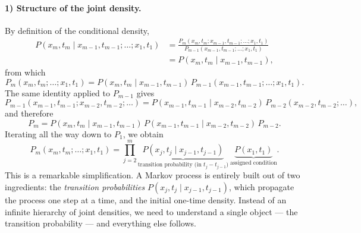 \paragraph{1) Structure of the joint density.}
By definition of the conditional density,
\begin{equation}\begin{split}
P(x_m,t_m\mid x_{m-1},t_{m-1};\dots;x_1,t_1)
&= \frac{P_m(x_m,t_m;x_{m-1},t_{m-1};\dots;x_1,t_1)}{P_{m-1}(x_{m-1},t_{m-1};\dots;x_1,t_1)}\\
&= P(x_m,t_m\mid x_{m-1},t_{m-1}),
\end{split}\end{equation}
from which
\begin{equation}
P_m(x_m,t_m;\dots;x_1,t_1) = P(x_m,t_m\mid x_{m-1},t_{m-1})\,P_{m-1}(x_{m-1},t_{m-1};\dots;x_1,t_1).
\end{equation}
The same identity applied to $P_{m-1}$ gives
\begin{equation}
P_{m-1}(x_{m-1},t_{m-1};x_{m-2},t_{m-2};\dots) = P(x_{m-1},t_{m-1}\mid x_{m-2},t_{m-2})\,P_{m-2}(x_{m-2},t_{m-2};\dots),
\end{equation}
and therefore
\begin{equation}
P_m = P(x_m,t_m\mid x_{m-1},t_{m-1})\,P(x_{m-1},t_{m-1}\mid x_{m-2},t_{m-2})\,P_{m-2}.
\end{equation}
Iterating all the way down to $P_1$, we obtain
\begin{equation}
P_m(x_m,t_m;\dots;x_1,t_1) = \prod_{j=2}^{m} \underbrace{P(x_j,t_j\mid x_{j-1},t_{j-1})}_{\text{transition probability (in } t_j-t_{j-1})}\ \underbrace{P(x_1,t_1)}_{\text{assigned condition}}.
\end{equation}
This is a remarkable simplification.
A Markov process is entirely built out of two ingredients: the \emph{transition probabilities} $P(x_j,t_j\mid x_{j-1},t_{j-1})$, which propagate the process one step at a time, and the initial one-time density.
Instead of an infinite hierarchy of joint densities, we need to understand a single object --- the transition probability --- and everything else follows.

